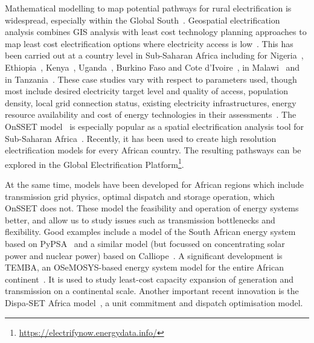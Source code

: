 \documentclass[conference, a4paper]{IEEEtran}
\begin{document}
Mathematical modelling to map potential pathways for rural electrification is widespread, especially within the Global South~\cite{bertheau-cader-ea-2016,cader-blechinger-ea-2016,alfaro-miller-2021,rocco-fumagalli-ea-2021,anwar-deshmukh-ea-2020}.
Geospatial electrification analysis combines GIS analysis with least cost technology planning approaches to map least cost electrification options where electricity access is low~\cite{mentis-howells-ea-2017,trotter-cooper-ea-2019}.
This has been carried out at a country level in Sub-Saharan Africa including for Nigeria~\cite{mentis-siyal-ea-2017,nerini-broad-ea-2016,mentis-welsch-ea-2015}, Ethiopia~\cite{mentis-andersson-ea-2016}, Kenya~\cite{mentis-howells-ea-2017,szabo-moner-girona-ea-2016,mentis-welsch-ea-2015}, Uganda~\cite{trotter-cooper-ea-2019}, Burkino Faso and Cote d’Ivoire~\cite{bissiri-moura-ea-2020}, in Malawi~\cite{korkovelos-khavari-ea-2019} and in Tanzania~\cite{menghwani-zerriffi-ea-2020}.
These case studies vary with respect to parameters used, though most include desired electricity target level and quality of access, population density, local grid connection status, existing electricity infrastructures, energy resource availability and cost of energy technologies in their assessments~\cite{menghwani-zerriffi-ea-2020}.
The OnSSET model~\cite{mentis-howells-ea-2017,korkovelos-khavari-ea-2019} is especially popular as a spatial electrification analysis tool for Sub-Saharan Africa~\cite{rocco-fumagalli-ea-2021}.
Recently, it has been used to create high resolution electrification models for every African country.
The resulting pathsways can be explored in the Global Electrification Platform\footnote{\url{https://electrifynow.energydata.info/}}.

At the same time, models have been developed for African regions which include transmission grid physics, optimal dispatch and storage operation, which OnSSET does not.
These model the feasibility and operation of energy systems better, and allow us to study issues such as transmission bottlenecks and flexibility.
Good examples include a model of the South African energy system based on PyPSA~\cite{horsch-calitz-2017} and a similar model (but focussed on concentrating solar power and nuclear power) based on Calliope~\cite{pfenninger-keirstead-2015}.
A significant development is TEMBA, an OSeMOSYS-based energy system model for the entire African continent~\cite{taliotis-shivakumar-ea-2016}.
It is used to study least-cost capacity expansion of generation and transmission on a continental scale.
Another important recent innovation is the Dispa-SET Africa model~\cite{pavicevic-defelice-ea-2021}, a unit commitment and dispatch optimisation model.
\end{document}
